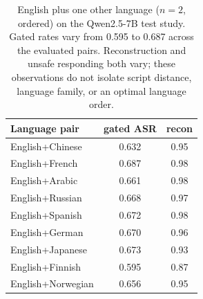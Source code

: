 \begin{table}[t]\centering
\caption{English plus one other language ($n=2$, ordered) on the Qwen2.5-7B test study. Gated rates vary from 0.595 to 0.687 across the evaluated pairs. Reconstruction and unsafe responding both vary; these observations do not isolate script distance, language family, or an optimal language order.}
\label{tab:langpairs}
\begin{tabular}{l cc}\toprule
Language pair & gated ASR & recon \\\midrule
English+Chinese & 0.632 & 0.95 \\
English+French & 0.687 & 0.98 \\
English+Arabic & 0.661 & 0.98 \\
English+Russian & 0.668 & 0.97 \\
English+Spanish & 0.672 & 0.98 \\
English+German & 0.670 & 0.96 \\
English+Japanese & 0.673 & 0.93 \\
English+Finnish & 0.595 & 0.87 \\
English+Norwegian & 0.656 & 0.95 \\
\bottomrule\end{tabular}\end{table}
